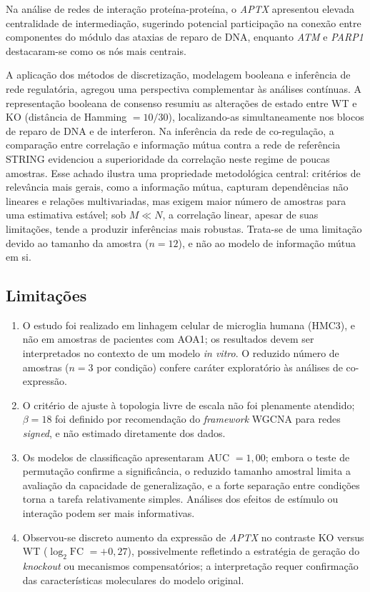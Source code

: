 \documentclass[10pt,letterpaper]{article}
\newcommand{\gene}[1]{\textit{#1}}
\newcommand{\logfc}{\ensuremath{\log_2\mathrm{FC}}}
\begin{document}
Na análise de redes de interação proteína-proteína, o \gene{APTX} apresentou
elevada centralidade de intermediação, sugerindo potencial participação na
conexão entre componentes do módulo das ataxias de reparo de DNA, enquanto
\gene{ATM} e \gene{PARP1} destacaram-se como os nós mais centrais.

A aplicação dos métodos de discretização, modelagem
booleana e inferência de rede regulatória, agregou uma perspectiva
complementar às análises contínuas. A representação booleana de consenso resumiu
as alterações de estado entre WT e KO (distância de Hamming \(=10/30\)),
localizando-as simultaneamente nos blocos de reparo de DNA e de interferon. Na
inferência da rede de co-regulação, a comparação entre correlação e informação
mútua contra a rede de referência STRING evidenciou a superioridade da
correlação neste regime de poucas amostras. Esse achado ilustra uma propriedade
metodológica central: critérios de relevância mais gerais, como a informação
mútua, capturam dependências não lineares e relações multivariadas, mas exigem
maior número de amostras para uma estimativa estável; sob \(M \ll N\), a
correlação linear, apesar de suas limitações, tende a produzir inferências mais
robustas. Trata-se de uma limitação devido ao tamanho da amostra (\(n=12\)), e não ao modelo de informação mútua em si.

\subsection*{Limitações}

\begin{enumerate}
\item O estudo foi realizado em linhagem celular de microglia humana (HMC3), e
não em amostras de pacientes com AOA1; os resultados devem ser interpretados no
contexto de um modelo \emph{in vitro}. O reduzido número de amostras
(\(n=3\) por condição) confere caráter exploratório às análises de co-expressão.
\item O critério de ajuste à topologia livre de escala não foi plenamente
atendido; \(\beta=18\) foi definido por recomendação do \emph{framework} WGCNA
para redes \emph{signed}, e não estimado diretamente dos dados.
\item Os modelos de classificação apresentaram AUC \(=1{,}00\); embora o teste de
permutação confirme a significância, o reduzido tamanho amostral limita a
avaliação da capacidade de generalização, e a forte separação entre condições
torna a tarefa relativamente simples. Análises dos efeitos de estímulo ou
interação podem ser mais informativas.
\item Observou-se discreto aumento da expressão de \gene{APTX} no contraste KO
versus WT (\logfc{} \(=+0{,}27\)), possivelmente refletindo a estratégia de
geração do \emph{knockout} ou mecanismos compensatórios; a interpretação requer
confirmação das características moleculares do modelo original.
\end{enumerate}
\end{document}
